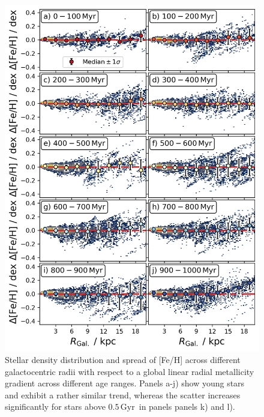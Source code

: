 \documentclass[fleqn,usenatbib]{mnras}
\newcommand{\SB}[1]{{\textcolor{purple}{SB: #1}}}
\newcommand{\nihaoAGEmax}{$0.5\,\mathrm{Gyr}$}
\begin{document}
\begin{figure}
    \centering
    \includegraphics[width=\columnwidth]{figures/scatter_with_increasing_age.png}
    \caption{Stellar density distribution and spread of [Fe/H] across different galactocentric radii with respect to a global linear radial metallicity gradient across different age ranges. Panels a-j) show young stars and exhibit a rather similar trend, whereas the scatter increases significantly for stars above \nihaoAGEmax\ in panels panels k) and l).}
    \label{fig:scatter_with_increasing_age}
\end{figure}


\end{document}
